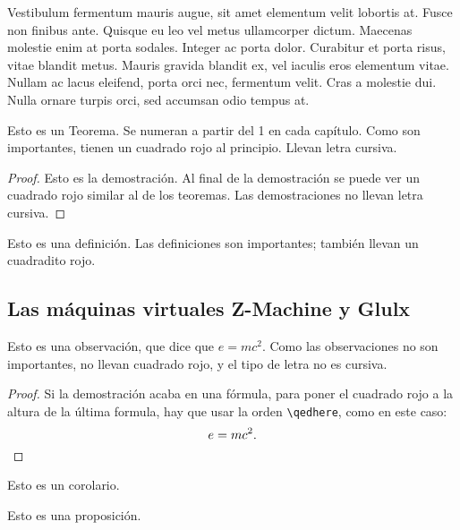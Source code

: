 Vestibulum fermentum mauris augue, sit amet elementum velit lobortis at. Fusce non finibus ante. Quisque eu leo vel metus ullamcorper dictum. Maecenas molestie enim at porta sodales. Integer ac porta dolor. Curabitur et porta risus, vitae blandit metus. Mauris gravida blandit ex, vel iaculis eros elementum vitae. Nullam ac lacus eleifend, porta orci nec, fermentum velit. Cras a molestie dui. Nulla ornare turpis orci, sed accumsan odio tempus at.

\begin{theorem}[Euclides]\label{thm:th1}
    Esto es un Teorema. Se numeran a partir del 1 en cada capítulo. Como son importantes, tienen un cuadrado rojo al principio. Llevan letra cursiva.
\end{theorem}

\begin{proof}
    Esto es la demostración. Al final de la demostración se puede ver un cuadrado rojo similar al de los teoremas. Las demostraciones no llevan letra cursiva.
\end{proof}

\begin{definition}\label{def:1}
    Esto es una definición. Las definiciones son importantes; también llevan un cuadradito rojo.
\end{definition}

\subsection{Las máquinas virtuales Z-Machine y Glulx}

\begin{remark}
    Esto es una observación, que dice que $e=mc^{2}$. Como las observaciones no son importantes, no llevan cuadrado rojo, y el tipo de letra no es cursiva.
\end{remark}

\begin{proof}
    Si la demostración acaba en una fórmula, para poner el cuadrado rojo a la altura de la última formula, hay que usar la orden \verb|\qedhere|, como en este caso:
    \[
        e=mc^{2}.\qedhere
    \]
\end{proof}

\begin{corollary}\label{cor:1}
    Esto es un corolario.
\end{corollary}

\begin{proposition}\label{pro:1}
    Esto es una proposición.
\end{proposition}

